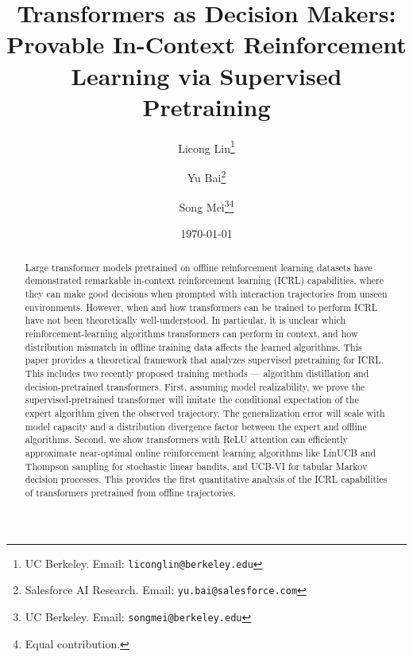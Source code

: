 \documentclass[10pt]{article}
\title{Transformers as Decision Makers: Provable In-Context Reinforcement Learning via Supervised Pretraining}
\date{\today}
\author{
  Licong Lin\thanks{UC Berkeley. Email: \texttt{liconglin@berkeley.edu}}\hspace{.35em}
  \and
  Yu Bai\thanks{Salesforce AI Research. Email: \texttt{yu.bai@salesforce.com}}\hspace{.35em}\footnotemark[4]
  \and
  Song Mei\thanks{UC Berkeley. Email: \texttt{songmei@berkeley.edu}}\hspace{.35em}\thanks{Equal contribution.}
}
\newcommand{\<}{\left\langle}
\renewcommand{\>}{\right\rangle}
\begin{document}
\maketitle


\begin{abstract}



Large transformer models pretrained on offline reinforcement learning datasets have demonstrated remarkable in-context reinforcement learning (ICRL) capabilities, where they can make good decisions when prompted with interaction trajectories from unseen environments. However, when and how transformers can be trained to perform ICRL have not been theoretically well-understood. In particular, it is unclear which reinforcement-learning algorithms transformers can perform in context, and how distribution mismatch in offline training data affects the learned algorithms. 
This paper provides a theoretical framework that analyzes supervised pretraining for ICRL. This includes two recently proposed training methods --- algorithm distillation and decision-pretrained transformers. First, assuming model realizability, we prove the supervised-pretrained transformer will imitate the conditional expectation of the expert algorithm given the observed trajectory. The generalization error will scale with model capacity and a distribution divergence factor between the expert and offline algorithms. Second, we show transformers with ReLU attention can efficiently approximate near-optimal online reinforcement learning algorithms like LinUCB and Thompson sampling for stochastic linear bandits, and UCB-VI for tabular Markov decision processes. This provides the first quantitative analysis of the ICRL capabilities of transformers pretrained from offline trajectories. 






\end{abstract}
\end{document}
